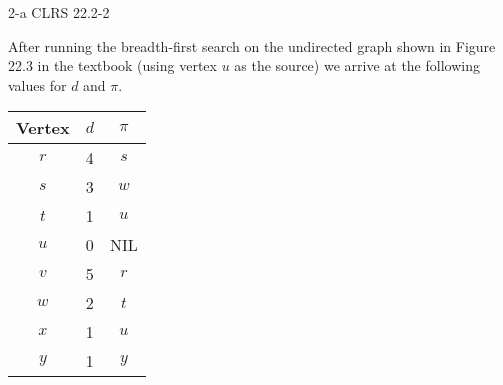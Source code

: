 \documentclass[11pt]{article}
\begin{document}
\begin{prob}{2-a}
CLRS 22.2-2
\end{prob}
\begin{sol} 

After running the breadth-first search on the undirected graph shown in Figure 22.3 in the textbook (using vertex $u$ as the source) we arrive at the following values for $d$ and $\pi$.

\begin{center}
  \begin{tabular}{| c | c  c |}
    \hline
	Vertex & $d$ & $\pi$ \\ \hline
	$r$ & 4 & $s$ \\
	$s$ & 3 & $w$ \\
	$t$ & 1 & $u$ \\
	$u$ & 0 & NIL\\ 
	$v$ & 5 & $r$\\ 
	$w$ & 2 & $t$\\
	$x$ & 1 & $u$\\
	$y$ & 1 & $y$\\ \hline
  \end{tabular}
\end{center}

\end{sol}
\end{document}
